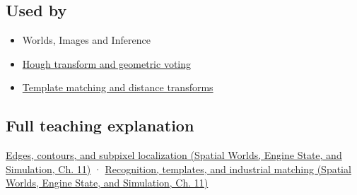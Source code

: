 \subsection{Used by}\label{appendix-36022286b03e-used-by}

\hypertarget{appendix-36022286b03e-used-by}{}

\begin{itemize}
\tightlist
\item
  {Worlds, Images and Inference}
\item
  \hyperref[appendix-a5b0383b3b3e]{Hough transform and geometric voting}
\item
  \hyperref[appendix-5fb4af80d1c7]{Template matching and distance transforms}
\end{itemize}

\subsection{Full teaching explanation}\label{appendix-36022286b03e-full-teaching-explanation}

\hypertarget{appendix-36022286b03e-full-teaching-explanation}{}

\href{../05-Spatial-Worlds-Engine-State-and-Simulation/main.pdf\#nameddest=04-visual-computing-ii-ch030-edges-contours-and-subpixel-localization}{Edges, contours, and subpixel localization (Spatial Worlds, Engine State, and Simulation, Ch. 11)} · \href{../05-Spatial-Worlds-Engine-State-and-Simulation/main.pdf\#nameddest=04-visual-computing-ii-ch030-recognition-templates-and-industrial-matching}{Recognition, templates, and industrial matching (Spatial Worlds, Engine State, and Simulation, Ch. 11)}
